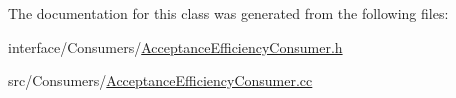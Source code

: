 \label{classAcceptanceEfficiencyConsumer_ad2a504069043f69a4d1f1eefc6146b70}


The documentation for this class was generated from the following files:\begin{DoxyCompactItemize}
\item 
interface/Consumers/\hyperlink{AcceptanceEfficiencyConsumer_8h}{AcceptanceEfficiencyConsumer.h}\item 
src/Consumers/\hyperlink{AcceptanceEfficiencyConsumer_8cc}{AcceptanceEfficiencyConsumer.cc}\end{DoxyCompactItemize}
